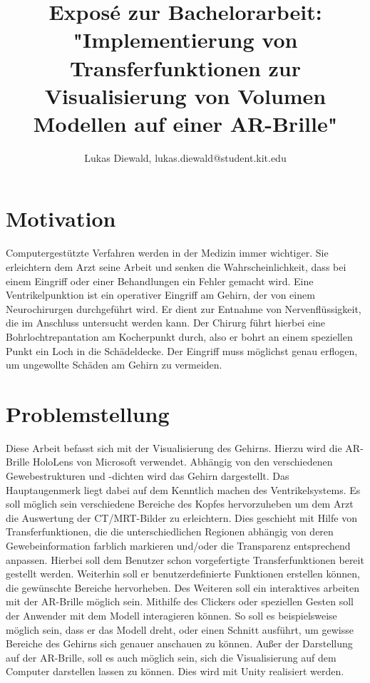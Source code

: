 \documentclass{article}
\title{
Exposé zur Bachelorarbeit:\\
 \textbf{"Implementierung von Transferfunktionen zur Visualisierung von Volumen Modellen auf einer AR-Brille"}
}
\author{Lukas Diewald, lukas.diewald@student.kit.edu}
\begin{document}
\maketitle

\section{Motivation}

Computergestützte Verfahren werden in der Medizin immer wichtiger. Sie erleichtern dem Arzt seine Arbeit und senken die Wahrscheinlichkeit, dass bei einem Eingriff oder einer Behandlungen ein Fehler gemacht wird.
\newline
Eine Ventrikelpunktion ist ein operativer Eingriff am Gehirn, der von einem Neurochirurgen durchgeführt wird. Er dient zur Entnahme von Nervenflüssigkeit, die im Anschluss untersucht werden kann. Der Chirurg führt hierbei eine Bohrlochtrepantation am Kocherpunkt durch, also er bohrt an einem speziellen Punkt ein Loch in die Schädeldecke. Der Eingriff muss möglichst genau erflogen, um ungewollte Schäden am Gehirn zu vermeiden.


\section{Problemstellung}

Diese Arbeit befasst sich mit der Visualisierung des Gehirns. Hierzu wird die AR-Brille  HoloLens von Microsoft verwendet. Abhängig von den verschiedenen Gewebestrukturen und -dichten wird das Gehirn dargestellt. Das Hauptaugenmerk liegt dabei auf dem Kenntlich machen des Ventrikelsystems.
\newline
Es soll möglich sein verschiedene Bereiche des Kopfes hervorzuheben um dem Arzt die Auswertung der CT/MRT-Bilder zu erleichtern. Dies geschieht mit Hilfe von Transferfunktionen, die die unterschiedlichen Regionen abhängig von deren Gewebeinformation farblich markieren und/oder die Transparenz entsprechend anpassen. Hierbei soll dem Benutzer schon vorgefertigte Transferfunktionen bereit gestellt werden. Weiterhin soll er benutzerdefinierte Funktionen erstellen können, die gewünschte Bereiche hervorheben.
\newline
Des Weiteren soll ein interaktives arbeiten mit der AR-Brille möglich sein. Mithilfe des Clickers oder speziellen Gesten soll der Anwender mit dem Modell interagieren können. So soll es beispielsweise möglich sein, dass er das Modell dreht, oder einen Schnitt ausführt, um gewisse Bereiche des Gehirns sich genauer anschauen zu können.
\newline
Außer der Darstellung auf der AR-Brille, soll es auch möglich sein, sich die Visualisierung auf dem Computer darstellen lassen zu können. Dies wird mit Unity realisiert werden.
\end{document}
